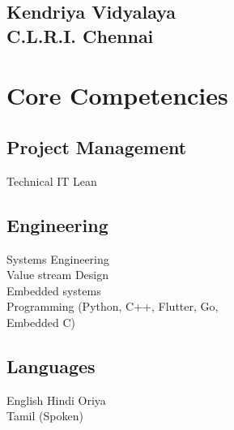 \documentclass[]{deedy-resume-openfont}
\begin{document}
\begin{minipage}[t]{0.33\textwidth}
\sectionsep

\subsection{Kendriya Vidyalaya \\C.L.R.I. Chennai}
\sectionsep

\section{Core Competencies}
\subsection{Project Management}
Technical \textbullet{} IT  \textbullet{} Lean
\sectionsep
\subsection{Engineering}
Systems Engineering \\Value stream Design \\
Embedded systems \\ Programming (Python, C++, Flutter, Go,\\Embedded C)
\sectionsep

\subsection{Languages}
English \textbullet{} Hindi \textbullet{} Oriya \\
Tamil (Spoken)


%
%

\end{minipage} 
\hfill
\end{document}
